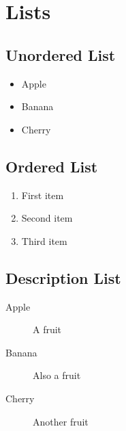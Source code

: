 \documentclass[12pt]{article}
\begin{document}
\section{Lists}

\subsection{Unordered List}
\begin{itemize}
    \item Apple
    \item Banana
    \item Cherry
\end{itemize}

\subsection{Ordered List}
\begin{enumerate}
    \item First item
    \item Second item
    \item Third item
\end{enumerate}

\subsection{Description List}
\begin{description}
    \item[Apple] A fruit
    \item[Banana] Also a fruit
    \item[Cherry] Another fruit
\end{description}
\end{document}
